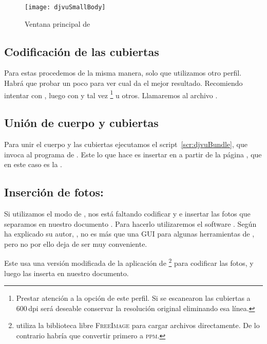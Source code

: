 \documentclass[%
	a5paper,
	10pt,
	twoside,
	openright,
	final,
]{memoir}
\begin{document}
{	\begin{figure}
		\texttt{[image: djvuSmallBody]}
		\caption{Ventana principal de \djvusmall\label{fig:djvuSmallBody}}
	\end{figure}

	\subsection{Codificación de las cubiertas\label{sec:djvuSmallCovers}} Para estas procedemos de la misma manera, solo que utilizamos otro perfil. Habrá que probar un poco para ver cual da el mejor resultado. Recomiendo intentar con , luego con  y tal vez \footnote{Prestar atención a la opción  de este perfil. Si se escanearon las cubiertas a 600\,dpi será deseable conservar la resolución original eliminando esa línea.} u otros. Llamaremos al archivo .

	\subsection{Unión de cuerpo y cubiertas} Para unir el cuerpo y las cubiertas ejecutamos el script~\ref{scr:djvuBundle}, que invoca al programa  de \djvulibre. Este lo que hace es insertar  en  a partir de la página , que en este caso es la .


	\subsection{Inserción de fotos: \djvuimager\label{sec:djvuImager}} Si utilizamos el modo  de \scantailor, nos está faltando codificar y e insertar las fotos que separamos en nuestro documento \djvu. Para hacerlo utilizaremos el software \djvuimager. Según ha explicado su autor, \mondaytwothousand, no es más que una GUI para algunas herramientas de \djvulibre, pero no por ello deja de ser muy conveniente.

	Este usa una versión modificada de la aplicación  de \djvulibre\footnote{ utiliza la biblioteca libre \textsc{FreeImage} \cite{FreeImage} para cargar archivos \tiff directamente. De lo contrario habría que convertir primero a \textsc{ppm}.} para codificar las fotos, y luego las inserta en nuestro documento.

}
\end{document}
